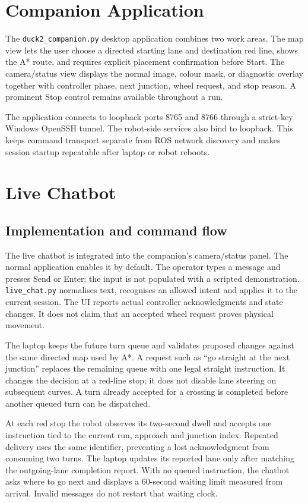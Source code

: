 \documentclass[10pt,a4paper,twocolumn]{article}
\newcommand{\code}[1]{\texttt{#1}}
\begin{document}
\section{Companion Application}

The \code{duck2\_companion.py} desktop application combines two work areas. The
map view lets the user choose a directed starting lane and destination red line,
shows the A* route, and requires explicit placement confirmation before Start.
The camera/status view displays the normal image, colour mask, or diagnostic
overlay together with controller phase, next junction, wheel request, and stop
reason. A prominent Stop control remains available throughout a run.

The application connects to loopback ports 8765 and 8766 through a strict-key
Windows OpenSSH tunnel. The robot-side services also bind to loopback. This
keeps command transport separate from ROS network discovery and makes session
startup repeatable after laptop or robot reboots.


\section{Live Chatbot}

\subsection{Implementation and command flow}

The live chatbot is integrated into the companion's camera/status panel. The
normal application enables it by default. The
operator types a message and presses Send or Enter; the input is not populated
with a scripted demonstration. \code{live\_chat.py} normalises text, recognises
an allowed intent and applies it to the current session. The UI reports actual
controller acknowledgments and state changes. It does not claim that an
accepted wheel request proves physical movement.

The laptop keeps the future turn queue and validates proposed changes against
the same directed map used by A*. A request such as ``go straight at the next
junction'' replaces the remaining queue with one legal straight instruction.
It changes the decision at a red-line stop; it does not disable lane steering
on subsequent curves. A turn already accepted for a crossing is completed
before another queued turn can be dispatched.

At each red stop the robot observes its two-second dwell and accepts one
instruction tied to the current run, approach and junction index. Repeated
delivery uses the same identifier, preventing a lost acknowledgment from
consuming two turns. The laptop updates its reported lane only after matching
the outgoing-lane completion report. With no queued instruction, the chatbot
asks where to go next and displays a 60-second waiting limit measured from
arrival. Invalid messages do not restart that waiting clock.
\end{document}

